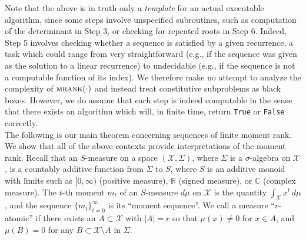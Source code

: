 \documentclass[12pt,reqno]{article}
\newcommand{\malg}{\textsc{mrank}}
\begin{document}
Note that the above is in truth only a {\em template} for an actual executable algorithm, since some steps involve unspecified subroutines, such as computation of the determinant in Step 3, or checking for repeated roots in Step 6. Indeed, Step 5 involves checking whether a sequence is satisfied by a given recurrence, a task which could range from very straightforward (e.g., if the sequence was given as the solution to a linear recurrence) to undecidable (e.g., if the sequence is not a computable function of its index).  We therefore make no attempt to analyze the complexity of $\malg(\cdot)$ and instead treat constitutive subproblems as black boxes.  However, we do assume that each step is indeed computable in the sense that there exists an algorithm which will, in finite time, return \texttt{True} or \texttt{False} correctly.\\

The following is our main theorem concerning sequences of finite moment rank.  We show that all of the above contexts provide interpretations of the moment rank.  Recall that an $S$-measure on a space $(\mathcal{X},\Sigma)$, where $\Sigma$ is a $\sigma$-algebra on $\mathcal{X}$, is a countably additive function from $\Sigma$ to $S$, where $S$ is an additive monoid with limits such as $[0,\infty)$ (positive measure), $\mathbb{R}$ (signed measure), or $\mathbb{C}$ (complex measure). The $t$-th moment $m_t$ of an $S$-measure $d\mu$ on $\mathcal{X}$ is the quantity $\int_\mathcal{X} x^t \, d\mu$, and the sequence $\{m_t\}_{t =0}^\infty$ is its ``moment sequence''.  We call a measure ``$r$-atomic'' if there exists an $A \subset \mathcal{X}$ with $|A|=r$ so that $\mu(x) \neq 0$ for $x \in A$, and $\mu(B) = 0$ for any $B \subset \mathcal{X} \setminus A$ in $\Sigma$.
\end{document}
